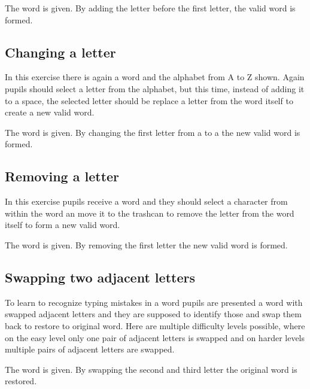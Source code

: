 \begin{example}
    The word  is given. By adding the letter  before the first letter, the valid word  is formed.
\end{example}

\subsection*{Changing a letter}

In this exercise there is again a word and the alphabet from A to Z shown. Again pupils should select a letter from the alphabet, but this time, instead of adding it to a space, the selected letter should be replace a letter from the word itself to create a new valid word.

\begin{example}
    The word  is given. By changing the first letter from a  to a  the new valid word  is formed.
\end{example}

\subsection*{Removing a letter}

In this exercise pupils receive a word and they should select a character from within the word an move it to the trashcan to remove the letter from the word itself to form a new valid word.

\begin{example}
    The word  is given. By removing the first letter the new valid word  is formed.
\end{example}

\subsection*{Swapping two adjacent letters}

To learn to recognize typing mistakes in a word pupils are presented a word with swapped adjacent letters and they are supposed to identify those and swap them back to restore to original word. Here are multiple difficulty levels possible, where on the easy level only one pair of adjacent letters is swapped and on harder levels multiple pairs of adjacent letters are swapped.

\begin{example}
    The word  is given. By swapping the second and third letter the original word  is restored.
\end{example}

